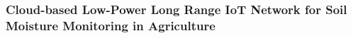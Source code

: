 \documentclass[12pt, a4paper]{article}
\begin{document}
\subsubsection{Cloud-based Low-Power Long Range IoT Network for Soil Moisture Monitoring in Agriculture}
\end{document}
